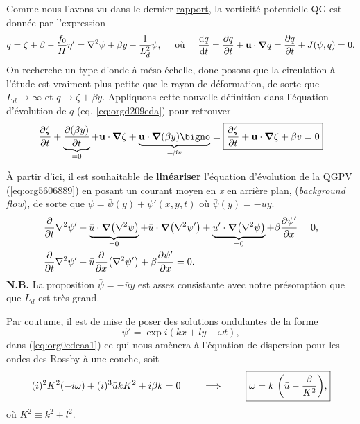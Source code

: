 \documentclass[10pt]{article}
\numberwithin{equation}{section}
\begin{document}
Comme nous l'avons vu dans le dernier \href{rapport-2023-03-24.org}{rapport}, la vorticité potentielle QG est donnée par l'expression
\begin{equation}
\label{eq:orgd209eda}
q = \zeta + \beta - \frac{f_0}{H} \eta' = \laplacian \psi + \beta y - \frac{1}{L_d^2} \psi,
\hspace{0.5cm}\text{où}\hspace{0.5cm}
\dv{q}{t} = \pdv{q}{t} + \vb{u} \cdot \gradient q = \pdv{q}{t} + J(\psi,q) =  0.
\end{equation}
On recherche un type d'onde à méso-échelle, donc posons que la circulation à l'étude est vraiment plus petite que le rayon de déformation, de sorte que \(L_d \rightarrow \infty\) et \(q \rightarrow \zeta + \beta y\).
Appliquons cette nouvelle définition dans l'équation d'évolution de \(q\) (eq. \ref{eq:orgd209eda}) pour retrouver
\begin{equation}
\label{eq:org5606889}
\pdv{\zeta}{t} + \underbrace{\pdv{(\beta y)}{t}}_{=0} + \vb{u}\cdot \gradient \zeta + \underbrace{\vb{u} \cdot \gradient(\beta y)\bigno}_{ =\beta v}
= \boxed{
\pdv{\zeta}{t} + \vb{u}\cdot\gradient\zeta  + \beta v = 0
}
\end{equation}

À partir d'ici, il est souhaitable de \textbf{linéariser} l'équation d'évolution de la QGPV (\ref{eq:org5606889}) en posant un courant moyen  en \emph{x} en arrière plan, (\emph{background flow}), de sorte que \(\psi = \bar{\psi}(y) + \psi'(x,y,t)\) où \(\bar{\psi}(y)=-\bar{u}y\).
\begin{align}
\label{eq:org0cdeaa1}
&\pdv{t} \laplacian \psi' + \underbrace{\bar{u}\cdot \gradient (\laplacian \bar{\psi}) }_{=0}
+ \bar{u}\cdot \gradient (\laplacian \psi')
+ \underbrace{u'\cdot \gradient (\laplacian \bar{\psi}) }_{=0}
+ \beta \pdv{\psi'}{x} = 0,\nonumber \\
%
&\pdv{t} \laplacian \psi' + \bar{u}\pdv{x} (\laplacian \psi') + \beta \pdv{\psi'}{x} = 0.
\end{align}
\textbf{N.B.} La proposition \(\bar{\psi} = -\bar{u} y\) est assez consistante avec notre présomption que que \(L_d\) est très grand. \bigskip

Par coutume, il est de mise de poser des solutions ondulantes de la forme
\begin{equation}
\psi' = \exp{i(kx + ly -\omega t)},
\end{equation}
dans (\ref{eq:org0cdeaa1}) ce qui nous amènera à l'équation de dispersion pour les ondes des Rossby à une couche, soit
\begin{equation}
(i)^2 K^2(-i\omega) + (i)^3\bar{u} k K^2 + i \beta k = 0
\hspace{0.8cm}\Longrightarrow\hspace{0.8cm}
\boxed{\omega = k \ \qty(\bar{u} - \frac{\beta}{K^2}),}
\end{equation}
où \(K^2 \equiv k^2 + l^2\).\bigskip
\end{document}
